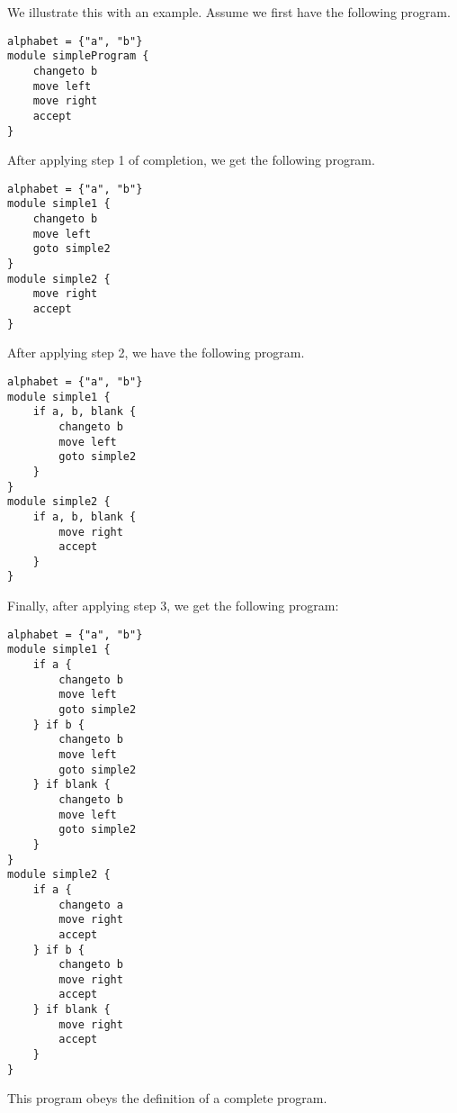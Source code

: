We illustrate this with an example. Assume we first have the following program.
\begin{lstlisting}[language=TML]
alphabet = {"a", "b"}
module simpleProgram {
    changeto b
    move left
    move right
    accept
}
\end{lstlisting}
After applying step 1 of completion, we get the following program.
\begin{lstlisting}[language=TML]
alphabet = {"a", "b"}
module simple1 {
    changeto b
    move left
    goto simple2
}
module simple2 {
    move right
    accept
}
\end{lstlisting}
After applying step 2, we have the following program.
\begin{lstlisting}[language=TML]
alphabet = {"a", "b"}
module simple1 {
    if a, b, blank {
        changeto b
        move left
        goto simple2
    }
}
module simple2 {
    if a, b, blank {
        move right
        accept
    }
}
\end{lstlisting}
Finally, after applying step 3, we get the following program:
\begin{lstlisting}[language=TML]
alphabet = {"a", "b"}
module simple1 {
    if a {
        changeto b
        move left
        goto simple2
    } if b {
        changeto b
        move left
        goto simple2
    } if blank {
        changeto b
        move left
        goto simple2
    }
}
module simple2 {
    if a {
        changeto a
        move right
        accept
    } if b {
        changeto b
        move right
        accept
    } if blank {
        move right
        accept
    }
}
\end{lstlisting}
This program obeys the definition of a complete program.

